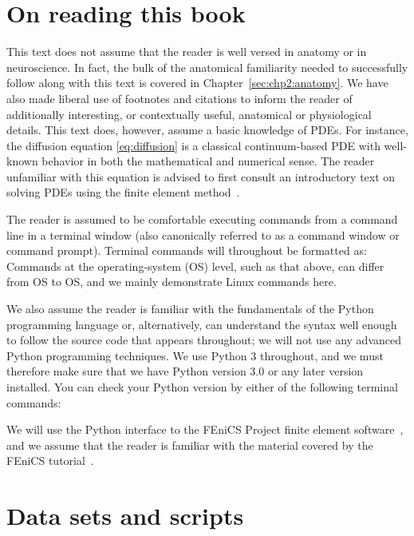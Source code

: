 \section{On reading this book}
This text does not assume that the reader is well versed in anatomy or in 
neuroscience.  In fact, the bulk of the anatomical familiarity needed to 
successfully follow along with this text is covered in 
Chapter~\ref{sec:chp2:anatomy}.  We have also made liberal use of footnotes and 
citations to inform the reader of additionally interesting, or contextually 
useful, anatomical or physiological details. This text does, however, assume a 
basic knowledge of PDEs. For instance, the diffusion equation 
\eqref{eq:diffusion} is a classical continuum-based PDE with well-known 
behavior in both the mathematical and numerical sense. The reader unfamiliar 
with this equation is advised to first consult an introductory text on solving 
PDEs using the finite element
method~\cite{gockenbach2006understanding,
  langtangen2016solving, langtangen2019introduction,tveito2004introduction}.

The reader is assumed to be comfortable executing commands from a
command line in a terminal window (also canonically referred
to as a command window or command prompt). Terminal commands
will throughout be formatted as:
\noindent Commands at the operating-system (OS) level, such as that above,
can differ from OS to OS, and we mainly demonstrate Linux commands
here.

We also assume the reader is familiar with the fundamentals of the
Python programming language or, alternatively, can understand the
syntax well enough to follow the source code that appears throughout;
we will not use any advanced Python programming techniques. We use
Python 3 throughout, and we must therefore make sure that we have Python
version 3.0 or any later version installed. You can check
your Python version by either of the following terminal commands:

We will use the Python interface to the FEniCS Project finite
element software~\cite{alnaes2015fenics}, and we assume that the
reader is familiar with the material covered by the FEniCS
tutorial~\cite{langtangen2016solving}.

\section{Data sets and scripts}

